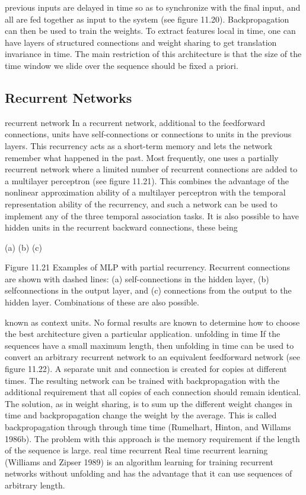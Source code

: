 previous inputs are delayed in time so as to synchronize with the final input, and all are fed together as input to the system (see figure 11.20). Backpropagation can then be used to train the weights. To extract features local in time, one can have layers of structured connections and weight sharing to get translation invariance in time. The main restriction of this architecture is that the size of the time window we slide over the sequence should be fixed a priori.

\subsection{Recurrent Networks}

recurrent network In a recurrent network, additional to the feedforward connections, units have self-connections or connections to units in the previous layers. This recurrency acts as a short-term memory and lets the network remember what happened in the past. Most frequently, one uses a partially recurrent network where a limited number of recurrent connections are added to a multilayer perceptron (see figure 11.21). This combines the advantage of the nonlinear approximation ability of a multilayer perceptron with the temporal representation ability of the recurrency, and such a network can be used to implement any of the three temporal association tasks. It is also possible to have hidden units in the recurrent backward connections, these being

(a) (b) (c)

Figure 11.21 Examples of MLP with partial recurrency. Recurrent connections are shown with dashed lines: (a) self-connections in the hidden layer, (b) selfconnections in the output layer, and (c) connections from the output to the hidden layer. Combinations of these are also possible.

known as context units. No formal results are known to determine how to choose the best architecture given a particular application. unfolding in time If the sequences have a small maximum length, then unfolding in time can be used to convert an arbitrary recurrent network to an equivalent feedforward network (see figure 11.22). A separate unit and connection is created for copies at different times. The resulting network can be trained with backpropagation with the additional requirement that all copies of each connection should remain identical. The solution, as in weight sharing, is to sum up the different weight changes in time and backpropagation change the weight by the average. This is called backpropagation through through time time (Rumelhart, Hinton, and Willams 1986b). The problem with this approach is the memory requirement if the length of the sequence is large. real time recurrent Real time recurrent learning (Williams and Zipser 1989) is an algorithm learning for training recurrent networks without unfolding and has the advantage that it can use sequences of arbitrary length.

